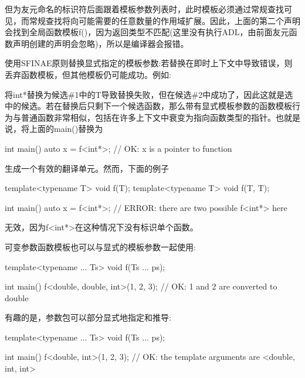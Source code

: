 但为友元命名的标识符后面跟着模板参数列表时，此时模板必须通过常规查找可见，而常规查找将向可能需要的任意数量的作用域扩展。因此，上面的第二个声明会找到全局函数模板f()，因为返回类型不匹配(这里没有执行ADL，由前面友元函数声明创建的声明会忽略)，所以是编译器会报错。

使用SFINAE原则替换显式指定的模板参数:若替换在即时上下文中导致错误，则丢弃函数模板，但其他模板仍可能成功。例如:


将int*替换为候选\#1中的T导致替换失败，但在候选\#2中成功了，因此这就是选中的候选。若在替换后只剩下一个候选函数，那么带有显式模板参数的函数模板行为与普通函数非常相似，包括在许多上下文中衰变为指向函数类型的指针。也就是说，将上面的main()替换为

\begin{cpp}
int main() {
	auto x = f<int*>; // OK: x is a pointer to function
}
\end{cpp}

生成一个有效的翻译单元。然而，下面的例子

\begin{cpp}
template<typename T> void f(T);
template<typename T> void f(T, T);

int main() {
	auto x = f<int*>; // ERROR: there are two possible f<int*> here
}
\end{cpp}

无效，因为f<int*>在这种情况下没有标识单个函数。

可变参数函数模板也可以与显式的模板参数一起使用:

\begin{cpp}
template<typename ... Ts> void f(Ts ... ps);

int main() {
	f<double, double, int>(1, 2, 3); // OK: 1 and 2 are converted to double
}
\end{cpp}

有趣的是，参数包可以部分显式地指定和推导:

\begin{cpp}
template<typename ... Ts> void f(Ts ... ps);

int main() {
	f<double, int>(1, 2, 3); // OK: the template arguments are <double, int, int>
}
\end{cpp}









